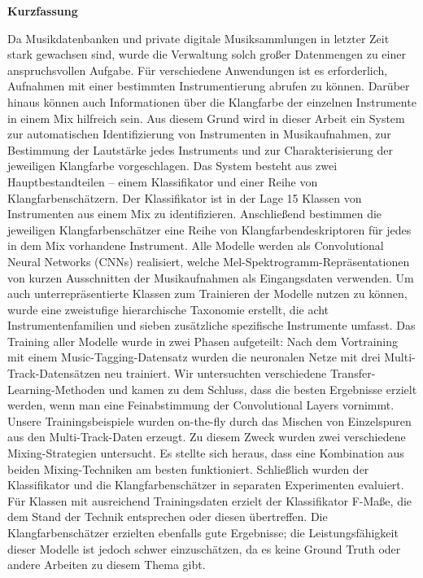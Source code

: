 \begin{center}\Large\bfseries Kurzfassung
\end{center}\vspace*{1cm}\noindent
Da Musikdatenbanken und private digitale Musiksammlungen in letzter Zeit stark gewachsen sind, wurde die Verwaltung solch großer Datenmengen zu einer anspruchsvollen Aufgabe. Für verschiedene Anwendungen ist es erforderlich, Aufnahmen mit einer bestimmten Instrumentierung abrufen zu können. Darüber hinaus können auch Informationen über die Klangfarbe der einzelnen Instrumente in einem Mix hilfreich sein. Aus diesem Grund wird in dieser Arbeit ein System zur automatischen Identifizierung von Instrumenten in Musikaufnahmen, zur Bestimmung der Lautstärke jedes Instruments und zur Charakterisierung der jeweiligen Klangfarbe vorgeschlagen. Das System besteht aus zwei Hauptbestandteilen -- einem Klassifikator und einer Reihe von Klangfarbenschätzern. Der Klassifikator ist in der Lage 15 Klassen von Instrumenten aus einem Mix zu identifizieren. Anschließend bestimmen die jeweiligen Klangfarbenschätzer eine Reihe von Klangfarbendeskriptoren für jedes in dem Mix vorhandene Instrument. Alle Modelle werden als \glqq Convolutional Neural Networks\grqq{} (CNNs) realisiert, welche Mel-Spektrogramm-Repräsentationen von kurzen Ausschnitten der Musikaufnahmen als Eingangsdaten verwenden. Um auch unterrepräsentierte Klassen zum Trainieren der Modelle nutzen zu können, wurde eine zweistufige hierarchische Taxonomie erstellt, die acht Instrumentenfamilien und sieben zusätzliche spezifische Instrumente umfasst. Das Training aller Modelle wurde in zwei Phasen aufgeteilt: Nach dem Vortraining mit einem Music-Tagging-Datensatz wurden die neuronalen Netze mit drei Multi-Track-Datensätzen neu trainiert. Wir untersuchten verschiedene Transfer-Learning-Methoden und kamen zu dem Schluss, dass die besten Ergebnisse erzielt werden, wenn man eine Feinabstimmung der Convolutional Layers vornimmt. Unsere Trainingsbeispiele wurden \glqq on-the-fly\grqq{} durch das Mischen von Einzelspuren aus den Multi-Track-Daten erzeugt. Zu diesem Zweck wurden zwei verschiedene Mixing-Strategien untersucht. Es stellte sich heraus, dass eine Kombination aus beiden Mixing-Techniken am besten funktioniert. Schließlich wurden der Klassifikator und die Klangfarbenschätzer in separaten Experimenten evaluiert. Für Klassen mit ausreichend Trainingsdaten erzielt der Klassifikator F-Maße, die dem Stand der Technik entsprechen oder diesen übertreffen. Die Klangfarbenschätzer erzielten ebenfalls gute Ergebnisse; die Leistungsfähigkeit dieser Modelle ist jedoch schwer einzuschätzen, da es keine Ground Truth oder andere Arbeiten zu diesem Thema gibt.